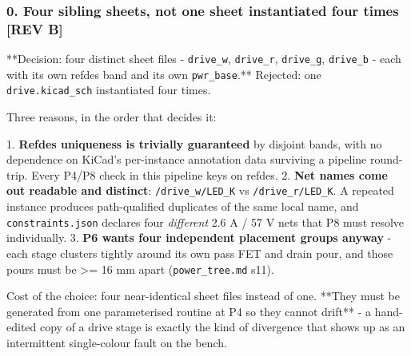 \documentclass[11pt,a4paper]{article}
\begin{document}
\subsubsection*{0. Four sibling sheets, not one sheet instantiated four times  \textbf{{[}REV B{]}}}
{*}{*}Decision: four distinct sheet files - \texttt{drive\_w}, \texttt{drive\_r}, \texttt{drive\_g}, \texttt{drive\_b} - each with its own refdes band and its own \texttt{pwr\_base}.{*}{*} Rejected: one \texttt{drive.kicad\_sch} instantiated four times.

Three reasons, in the order that decides it:

1. \textbf{Refdes uniqueness is trivially guaranteed} by disjoint bands, with no dependence on KiCad's per-instance annotation data surviving a pipeline round-trip. Every P4/P8 check in this pipeline keys on refdes. 2. \textbf{Net names come out readable and distinct}: \texttt{/drive\_w/LED\_K} vs \texttt{/drive\_r/LED\_K}. A repeated instance produces path-qualified duplicates of the same local name, and \texttt{constraints.json} declares four \emph{different} 2.6 A / 57 V nets that P8 must resolve individually. 3. \textbf{P6 wants four independent placement groups anyway} - each stage clusters tightly around its own pass FET and drain pour, and those pours must be \textgreater{}= 16 mm apart (\texttt{power\_tree.md} s11).

Cost of the choice: four near-identical sheet files instead of one. {*}{*}They must be generated from one parameterised routine at P4 so they cannot drift{*}{*} - a hand-edited copy of a drive stage is exactly the kind of divergence that shows up as an intermittent single-colour fault on the bench.
\end{document}
